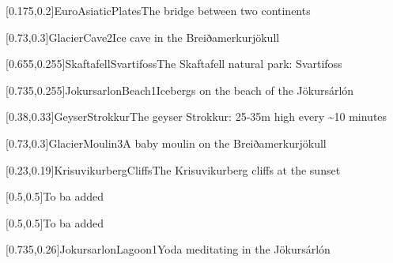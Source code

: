 



\graphicspath{{Figures/}{Figures/Iceland/}}


\subtitle{Day 2}
\date{27.10.2020}


    
    [0.175,0.2]{EuroAsiaticPlates}{The bridge between two continents}
    
    [0.73,0.3]{GlacierCave2}{Ice cave in the Breiðamerkurj\"okull}
    
    [0.655,0.255]{SkaftafellSvartifoss}{The Skaftafell natural park: Svartifoss}
    
    [0.735,0.255]{JokursarlonBeach1}{Icebergs on the beach of the J\"okurs\'arl\'on}
    
    [0.38,0.33]{GeyserStrokkur}{The geyser Strokkur: 25-35m high every \textasciitilde10 minutes}
    
    [0.73,0.3]{GlacierMoulin3}{A baby moulin on the Breiðamerkurj\"okull}
    
    [0.23,0.19]{KrisuvikurbergCliffs}{The Krisuvikurberg cliffs at the sunset}
    
    
    [0.5,0.5]{}{To ba added}
    
    [0.5,0.5]{}{To ba added}
    
    [0.735,0.26]{JokursarlonLagoon1}{Yoda meditating in the J\"okurs\'arl\'on}
    

